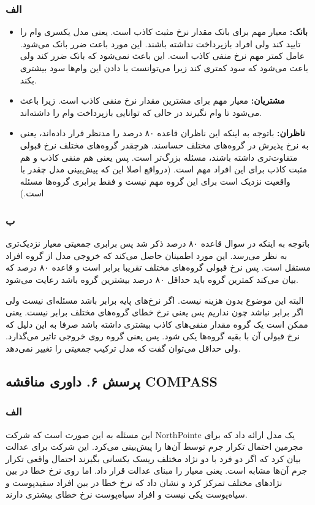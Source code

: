 \subsubsection{الف}
\begin{itemize}
	\item 
	\textbf{بانک: }
	معیار مهم برای بانک مقدار نرخ مثبت کاذب است. یعنی مدل یکسری وام را تایید کند ولی افراد بازپرداخت نداشته باشند. این مورد باعث ضرر بانک می‌شود. عامل کمتر مهم نرخ منفی کاذب است. این باعث نمی‌شود که بانک ضرر کند ولی باعث می‌شود که سود کمتری کند زیرا می‌توانست با دادن این وام‌ها سود بیشتری بکند. 
	
	\item 
	\textbf{مشتریان:}
	معیار مهم برای مشترین  مقدار نرخ منفی کاذب است. زیرا باعث می‌شود تا وام نگیرند در حالی که توانایی بازپرداخت وام را داشته‌اند. 
	
	\item 
	\textbf{ناظران:}
	باتوجه به اینکه این ناظران قاعده ۸۰ درصد را مدنظر قرار داده‌اند، یعنی به نرخ پذیرش در گروه‌های مختلف حساسند. هرچقدر گروه‌های مختلف نرخ قبولی متفاوت‌تری داشته باشند، مسئله بزرگ‌تر است. پس یعنی هم منفی کاذب و هم مثبت کاذب برای این افراد مهم است. (درواقع اصلا این که پیش‌بینی مدل چقدر با واقعیت نزدیک است برای این گروه مهم نیست و فقط برابری گروه‌ها مسئله است.)
\end{itemize}
\subsubsection{ب}
باتوجه به اینکه در سوال قاعده ۸۰ درصد ذکر شد پس برابری جمعیتی معیار نزدیک‌تری به نظر می‌رسد. این مورد اطمینان حاصل می‌کند که خروجی مدل از گروه افراد مستقل است. پس نرخ قبولی گروه‌های مختلف تقریبا برابر است و قاعده ۸۰ درصد که بیان می‌کند کمترین گروه باید حداقل ۸۰ درصد بیشترین گروه باشد رعایت می‌شود.

البته این موضوع بدون هزینه نیست. اگر نرخ‌های پایه برابر باشد مسئله‌ای نیست ولی اگر برابر نباشد چون 
نداریم پس یعنی نرخ خطای گروه‌های مختلف برابر نیست. یعنی ممکن است یک گروه مقدار منفی‌های کاذب بیشتری داشته باشد صرفا به این دلیل که نرخ قبولی آن با بقیه گروه‌ها یکی شود. پس یعنی گروه روی خروجی تاثیر می‌گذارد. ولی حداقل می‌توان گفت که مدل ترکیب جمعیتی را تغییر نمی‌دهد. 

\subsection{پرسش ۶. داوری مناقشه COMPASS}
\subsubsection{الف}
این مسئله به این صورت است که شرکت 
NorthPointe 
یک مدل ارائه داد که برای مجرمین احتمال تکرار جرم توسط آن‌ها را پیش‌بینی می‌کرد. این شرکت برای عدالت بیان کرد که اگر دو فرد با دو نژاد مختلف ریسک یکسانی بگیرند احتمال واقعی تکرار جرم آن‌ها مشابه است. یعنی معیار 
را مبنای عدالت قرار داد. اما 
روی نرخ خطا در بین نژادهای مختلف تمرکز کرد و نشان داد که نرخ خطا در بین افراد سفیدپوست و سیاه‌پوست یکی نیست و افراد سیاه‌پوست نرخ خطای بیشتری دارند.


